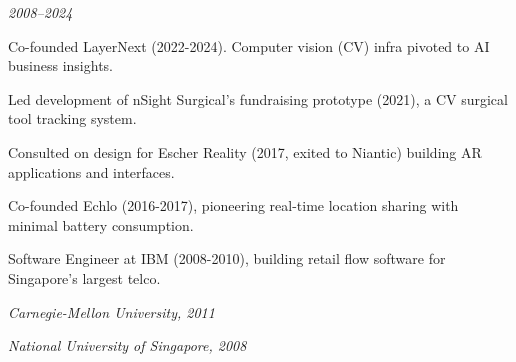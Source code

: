 \stopsectionlevel

\startsectionlevel[title={Additional
Experience},reference={additional-experience}]

{\em 2008--2024}

\startitemize[packed]
\item
  Co-founded LayerNext (2022-2024). Computer vision (CV) infra pivoted
  to AI business insights.
\item
  Led development of nSight Surgical's fundraising prototype (2021), a
  CV surgical tool tracking system.
\item
  Consulted on design for Escher Reality (2017, exited to Niantic)
  building AR applications and interfaces.
\item
  Co-founded Echlo (2016-2017), pioneering real-time location sharing
  with minimal battery consumption.
\item
  Software Engineer at IBM (2008-2010), building retail flow software
  for Singapore's largest telco.
\stopitemize

\stopsectionlevel

\stopsectionlevel

\startsectionlevel[title={Education},reference={education}]

\startsectionlevel[title={Masters in Human-Computer
Interaction},reference={masters-in-human-computer-interaction}]

{\em Carnegie-Mellon University, 2011}

\stopsectionlevel

\startsectionlevel[title={B.Eng (Hons.) in Electrical
Engineering},reference={b.eng-hons.-in-electrical-engineering}]

{\em National University of Singapore, 2008}

\stopsectionlevel

\stopsectionlevel
